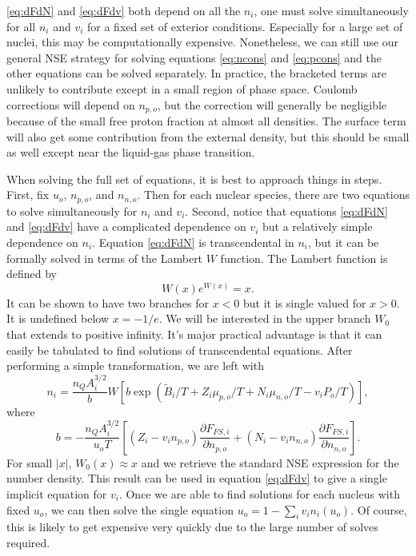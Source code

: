 \documentclass[11pt,letter]{article}
\begin{document}
\ref{eq:dFdN} and \ref{eq:dFdv} both depend on all the $n_i$, one must solve 
simultaneously for all $n_i$ and $v_i$ for a fixed set of exterior conditions. 
Especially for a large set of nuclei, this may be computationally expensive. 
Nonetheless, we can still use our general NSE strategy for solving equations 
\ref{eq:ncons} and \ref{eq:pcons} and the other equations can be solved 
separately. In practice, the bracketed terms are unlikely to contribute except in 
a small region of phase space. Coulomb corrections will depend on $n_{p,o}$, but 
the correction will generally be negligible because of the small free proton 
fraction at almost all densities. The surface term will also get some contribution
from the external density, but this should be small as well except near the 
liquid-gas phase transition. 

When solving the full set of equations, it is best to approach things in steps.
First, fix $u_o$, $n_{p,o}$, and $n_{n,o}$. Then for each nuclear species, there 
are two equations to solve simultaneously for $n_i$ and $v_i$. 
Second, notice that equations \ref{eq:dFdN} and \ref{eq:dFdv} have a complicated 
dependence on $v_i$ but a relatively simple dependence on $n_i$. Equation
\ref{eq:dFdN} is transcendental in $n_i$, but it can be formally solved in terms 
of the Lambert $W$ function. The Lambert function is defined by 
\begin{equation}
W(x)e^{W(x)} = x.
\end{equation}
It can be shown to have two branches for $x<0$ but it is single valued for $x>0$.
It is undefined below $x=-1/e$.  We will be interested in the upper branch $W_0$ 
that extends to positive infinity. It's major practical advantage is that it can
easily be tabulated to find solutions of transcendental equations. After 
performing a simple transformation, we are left with 
\begin{equation} 
n_i = \frac{n_Q A_i^{3/2}}{b} W\left[ b  \exp\left(\tilde B_i/T 
+ Z_i \mu_{p,o}/T + N_i \mu_{n,o}/T - v_i P_o/T \right) \right],
\end{equation}
where 
\begin{equation}
b = -\frac{n_Q A_i^{3/2}}{u_o T} 
\left[(Z_i-v_i n_{p,o}) \frac{\partial F_{FS,i}}{\partial n_{p,o}} 
+ (N_i-v_i n_{n,o}) \frac{\partial F_{FS,i}}{\partial n_{n,o}} \right].
\end{equation}
For small $|x|$, $W_0(x) \approx x$ and we retrieve the standard NSE expression for 
the number density. This result can be used in equation \ref{eq:dFdv} to give 
a single implicit equation for $v_i$. Once we are able to find solutions for each
nucleus with fixed $u_o$, we can then solve the single equation 
$u_o = 1 - \sum_i v_i n_i(u_o)$. Of course, this is likely to get expensive very
quickly due to the large number of solves required.
\end{document}
